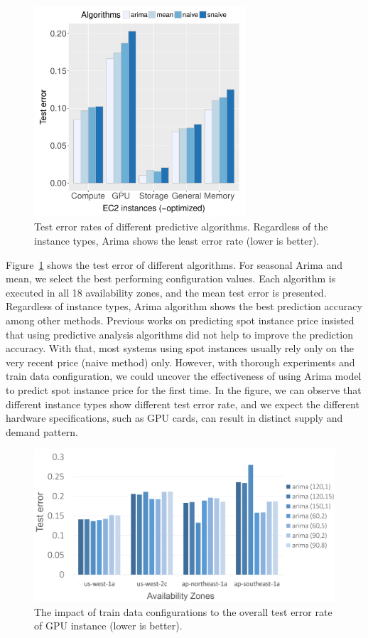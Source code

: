 \documentclass[graybox]{svmult}
\begin{document}
\begin{figure}
  \centering\includegraphics[width=0.7\textwidth]{figures/algorithm-compare-different-instance-type.pdf}\caption{Test error rates of different predictive algorithms. Regardless of the instance types, Arima shows the least error rate (lower is better).\label{fig:algo-diff-inst}}
\end{figure}

Figure~\ref{fig:algo-diff-inst} shows the test error of different algorithms. For seasonal Arima and mean, we select the best performing configuration values. Each algorithm is executed in all 18 availability zones, and the mean test error is presented. Regardless of instance types, Arima algorithm shows the best prediction accuracy among other methods. Previous works on predicting spot instance price insisted that using predictive analysis algorithms did not help to improve the prediction accuracy. With that, most systems using spot instances usually rely only on the very recent price (naive method) only. However, with thorough experiments and train data configuration, we could uncover the effectiveness of using Arima model to predict spot instance price for the first time. In the figure, we can observe that different instance types show different test error rate, and we expect the different hardware specifications, such as GPU cards, can result in distinct supply and demand pattern.  

\begin{figure}
  \centering\includegraphics[width=1.2\textwidth]{figures/g2-4m-l.png}\caption{The impact of train data configurations to the overall test error rate of GPU instance (lower is better).\label{fig:g2-param-diverse}}
\end{figure}
\end{document}
